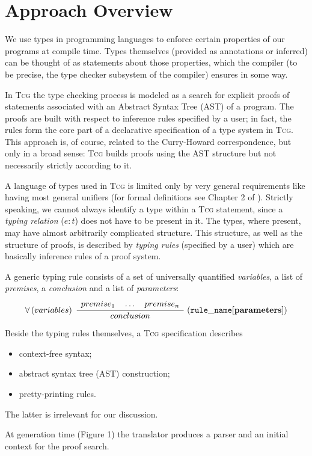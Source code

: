 \documentclass[a4paper,12pt]{article}
\newcommand{\Tcg}{\textsc{Tcg}}
\newcounter{premise}
\newcommand{\ifnotempty}[2]{\ifthenelse{\equal{#1}{}}{}{#2}}
\newcommand{\tcgrule}[5]{%
	\setcounter{premise}{0}%
$$%
    \ifnotempty{#1}{%
        \forall \left(#1\right)\;%
    }%
    \dfrac{%
	    \begin{array}[b]{l}%
	    #2%
            \end{array}%
    }{%
            #3%
    }%
    \;\ifnotempty{#4}{(\mathtt{#4}\ifnotempty{#5}{[\mathbf{#5}]})}%
$$%
}
\begin{document}
\section{Approach Overview}

We use types in programming languages to enforce certain properties of our programs at compile time. Types themselves (provided as annotations or inferred) can be thought of as statements about those properties, which the compiler (to be precise, the type checker subsystem of the compiler) ensures in some way.

In \Tcg{} the type checking process is modeled as a search for explicit proofs of statements associated with an Abstract Syntax Tree (AST) of a program. The proofs are built with respect to inference rules specified by a user; in fact, the rules form the core part of a declarative specification of a type system in \Tcg{}. This approach is, of course, related to the Curry-Howard correspondence, but only in a broad sense: \Tcg{} builds proofs using the AST structure but not necessarily strictly according to it. 

A language of types used in \Tcg{} is limited only by very general requirements like having most general unifiers (for formal definitions see Chapter 2 of \cite{Tcg}). Strictly speaking, we cannot always identify a type within a \Tcg{} statement, since a \emph{typing relation} ($e : t$) does not have to be present in it. The types, where present, may have almost arbitrarily complicated structure. This structure, as well as the structure of proofs, is described by \emph{typing rules} (specified by a user) which are basically inference rules of a proof system. 

A generic typing rule consists of a set of universally quantified \emph{variables}, a list of \emph{premises}, a \emph{conclusion} and a list of \emph{parameters}: 
\tcgrule{variables}{premise_1 \quad \dots \quad premise_n}{conclusion}{rule\_name}{parameters}

Beside the typing rules themselves, a \Tcg{} specification describes
\begin{itemize}
	\item context-free syntax;
	\item abstract syntax tree (AST) construction;
	\item pretty-printing rules.
\end{itemize}
The latter is irrelevant for our discussion.

At generation time (Figure 1) the translator produces a parser and an initial context for the proof search.
\end{document}
